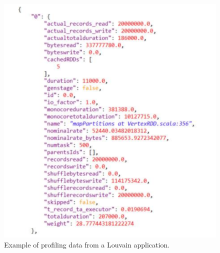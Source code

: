 \begin{figure}
	\centering
	\includegraphics[width=\columnwidth]{Images/profile_fragment.pdf}  
	\caption[Example of profiling data from a Louvain application]{Example of profiling data from a Louvain application.}
	\label{fig:profileFragment}
\end{figure}

